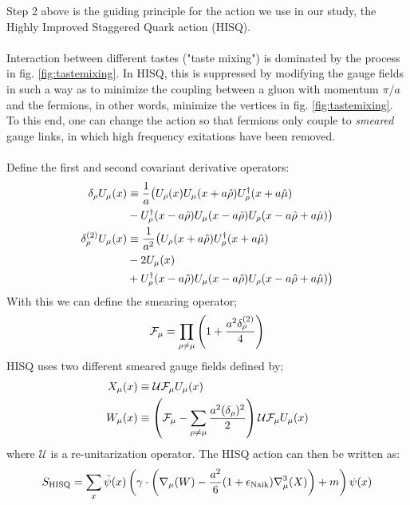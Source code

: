 Step 2 above is the guiding principle for the action we use in our study, the Highly Improved Staggered Quark action (HISQ). 
\\ \\
Interaction between different tastes ("taste mixing") is dominated by the process in fig. \ref{fig:tastemixing}. In HISQ, this is suppressed by modifying the gauge fields in such a way as to minimize the coupling between a gluon with momentum ${\pi/a}$ and the fermions, in other words, minimize the vertices in fig. \ref{fig:tastemixing}. To this end, one can change the action so that fermions only couple to \textit{smeared} gauge links, in which high frequency exitations have been removed. \\ \\
Define the first and second covariant derivative operators:
\begin{align}
	\nonumber
	\delta_{\rho}U_{\mu}(x) & \equiv {1\over a} \big( U_{\rho} (x) U_{\mu} (x + a\hat{\rho}) U_{\rho}^{\dagger}(x+a\hat{\mu}) \\
	& - U_{\rho}^{\dagger}(x-a\hat{\rho})U_{\mu}(x-a\hat{\rho})U_{\rho}(x-a\hat{\rho}+a\hat{\mu})\big)  \\
	\nonumber
	\delta_{\rho}^{(2)} U_{\mu}(x) & \equiv {1\over a^2} \big( U_{\rho}(x+a\hat{\rho})U^{\dagger}_{\rho}(x+a\hat{\mu}) \\
	\nonumber	
	& - 2U_{\mu}(x) \\
	& + U_{\rho}^{\dagger}(x-a\hat{\rho})U_{\mu}(x-a\hat{\rho})U_{\rho}(x - a\hat{\rho} + a\hat{\mu}) \big)
\end{align}
With this we can define the smearing operator;
\begin{align}
	\mathcal{F}_{\mu} = \prod_{\rho\neq\mu} \left( 1 + {a^2 \delta^{(2)}_{\rho}\over 4} \right)
\end{align}
HISQ uses two different smeared gauge fields defined by;
\begin{align}
	X_{\mu}(x) &\equiv \mathcal{U} \mathcal{F}_{\mu} U_{\mu}(x) \\
	W_{\mu}(x) &\equiv \left(\mathcal{F}_{\mu} - \sum_{\rho\neq\mu}{a^2(\delta_{\rho})^2\over 2} \right) \mathcal{U} \mathcal{F}_{\mu} U_{\mu}(x)
	\label{eq:gaugesmearing}
\end{align}
where $\mathcal{U}$ is a re-unitarization operator. The HISQ action can then be written as:
\begin{align}
	S_{\text{HISQ}} = \sum_{x} \bar{\psi}(x) \left( \gamma\cdot \left( \nabla_{\mu}(W) - {a^2\over 6}(1+\epsilon_{\text{Naik}})\nabla^3_{\mu}(X) \right) + m \right) \psi(x)
\end{align}
